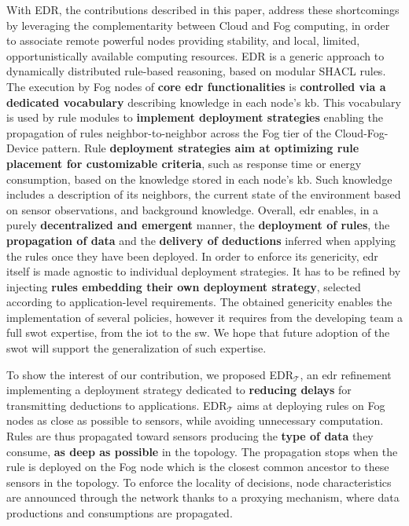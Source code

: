 \documentclass[sw]{iosart2x}
\newcommand{\edr}{EDR\xspace}
\newcommand{\edrt}{EDR$_{\mathcal{T}}$\xspace}
\begin{document}
With \edr, the contributions described in this paper, address these shortcomings by leveraging the complementarity between Cloud and Fog computing, in order to associate remote powerful nodes providing stability, and local, limited, opportunistically available computing resources.
\edr is a generic approach to dynamically distributed rule-based reasoning, based on modular SHACL rules.
The execution by Fog nodes of \textbf{core \gls{edr} functionalities} is \textbf{controlled via a dedicated vocabulary} describing knowledge in each node's \gls{kb}.
This vocabulary is used by rule modules to \textbf{implement deployment strategies} enabling the propagation of rules neighbor-to-neighbor across the Fog tier of the Cloud-Fog-Device pattern.
Rule \textbf{deployment strategies aim at optimizing rule placement for customizable criteria}, such as response time or energy consumption, based on the knowledge stored in each node's \gls{kb}.
Such knowledge includes a description of its neighbors, the current state of the environment based on sensor observations, and background knowledge.
Overall, \gls{edr} enables, in a purely \textbf{decentralized and emergent} manner, the \textbf{deployment of rules}, the \textbf{propagation of data} and the \textbf{delivery of deductions} inferred when applying the rules once they have been deployed.
In order to enforce its genericity, \gls{edr} itself is made agnostic to individual deployment strategies.
It has to be refined by injecting \textbf{rules embedding their own deployment strategy}, selected according to application-level requirements.
The obtained genericity enables the implementation of several policies, however it requires from the developing team a full \gls{swot} expertise, from the \gls{iot} to the \gls{sw}.
We hope that future adoption of the \gls{swot} will support the generalization of such expertise.

To show the interest of our contribution, we proposed \edrt, an \gls{edr} refinement implementing a deployment strategy dedicated to \textbf{reducing delays} for transmitting deductions to applications.
\edrt aims at deploying rules on Fog nodes as close as possible to sensors, while avoiding unnecessary computation.
Rules are thus propagated toward sensors producing the \textbf{type of data} they consume, \textbf{as deep as possible} in the topology. 
The propagation stops when the rule is deployed on the Fog node which is the closest common ancestor to these sensors in the topology.
To enforce the locality of decisions, node characteristics are announced through the network thanks to a proxying mechanism, where data productions and consumptions are propagated.
\end{document}
